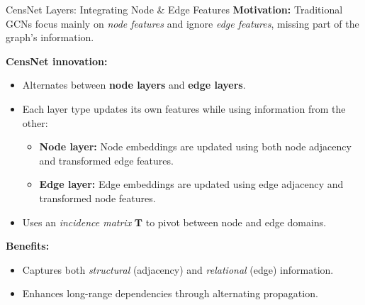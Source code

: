 \documentclass[hyperref={colorlinks,citecolor=blue,linkcolor=blue,urlcolor=blue}]{beamer}
\begin{document}
\begin{frame}{CensNet Layers: Integrating Node \& Edge Features}
\footnotesize
\textbf{Motivation:}  
Traditional GCNs focus mainly on \textit{node features} and ignore \textit{edge features}, missing part of the graph’s information.

\medskip
\textbf{CensNet innovation:}
\begin{itemize}
    \item Alternates between \textbf{node layers} and \textbf{edge layers}.
    \item Each layer type updates its own features while using information from the other:
    \begin{itemize}
        \item \footnotesize \textbf{Node layer:} Node embeddings are updated using both node adjacency and transformed edge features.
        \item \footnotesize \textbf{Edge layer:} Edge embeddings are updated using edge adjacency and transformed node features.
    \end{itemize}
    \item Uses an \textit{incidence matrix} \( \mathbf{T} \) to pivot between node and edge domains.
\end{itemize}

\medskip
\textbf{Benefits:}
\begin{itemize}
    \item Captures both \textit{structural} (adjacency) and \textit{relational} (edge) information.
    \item Enhances long-range dependencies through alternating propagation.
\end{itemize}
\end{frame}
\end{document}
